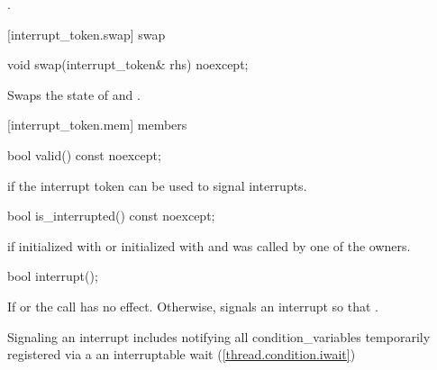 {\begin{itemdescr}
  \pnum\returns {}.
\end{itemdescr}

[interrupt_token.swap]{ swap}

%
\begin{itemdecl}
void swap(interrupt_token& rhs) noexcept;
\end{itemdecl}

\begin{itemdescr}
\pnum
\effects Swaps the state of  and .
\end{itemdescr}


[interrupt_token.mem]{ members}

%
\begin{itemdecl}
bool valid() const noexcept;
\end{itemdecl}
\begin{itemdescr}
  \pnum\returns {} if the interrupt token can be used to signal interrupts.
\end{itemdescr}

%
\begin{itemdecl}
bool is_interrupted() const noexcept;
\end{itemdecl}
\begin{itemdescr}
  \pnum\returns {} if initialized with 
                or initialized with  and  was called
                by one of the owners.
\end{itemdescr}

%
\begin{itemdecl}
bool interrupt();
\end{itemdecl}
\begin{itemdescr}

  \pnum\effects If  or  the call has no effect. 
                Otherwise, signals an interrupt so that .
                \begin{note} Signaling an interrupt includes notifying all condition_variables
                             temporarily registered via a an interruptable wait (\ref{thread.condition.iwait})
                             \end{note}



\end{itemdescr}}
